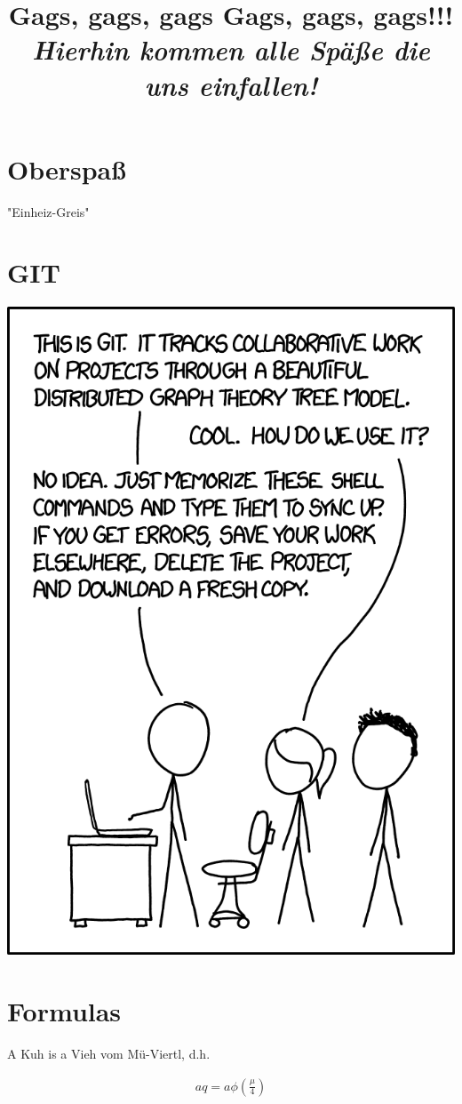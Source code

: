 \documentclass{article}
\title{Gags, gags, gags}
\title
{
  Gags, gags, gags!!! \\
  \vspace{4pt}
  \normalsize
  \textit{Hierhin kommen alle Späße die uns einfallen!}
}
\author{}
\date{}
\begin{document}
\maketitle

\section{Oberspaß}
"Einheiz-Greis"

\section{GIT}

\includegraphics[width = 0.5 \linewidth]{images/git_2x.png}

\section{Formulas}

A Kuh is a Vieh vom Mü-Viertl, d.h.

\begin{align}
  aq = a \phi \left( \frac{\mu}{4} \right)
\end{align}
\end{document}
